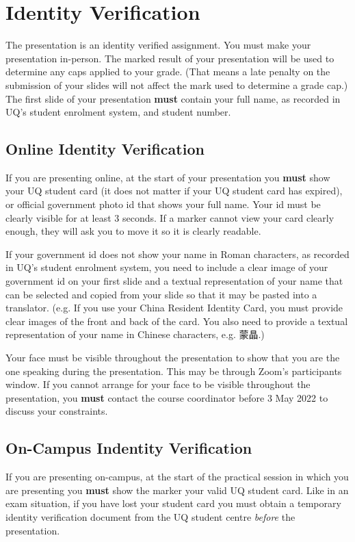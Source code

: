 \documentclass{csse4400}
\begin{document}
\section{Identity Verification}
The presentation is an identity verified assignment.
You must make your presentation in-person.
The marked result of your presentation will be used to determine any caps applied to your grade.
(That means a late penalty on the submission of your slides will not affect the mark used to determine a grade cap.)
The first slide of your presentation \textbf{must} contain your full name, as recorded in UQ's student enrolment system, and student number.

\subsection{Online Identity Verification}
If you are presenting online, at the start of your presentation you \textbf{must} show your UQ student card (it does not matter if your UQ student card has expired),
or official government photo id that shows your full name.
Your id must be clearly visible for at least 3 seconds.
If a marker cannot view your card clearly enough, they will ask you to move it so it is clearly readable.

\begin{CJK*}{UTF8}{gbsn}
If your government id does not show your name in Roman characters,
as recorded in UQ's student enrolment system, you need to include a clear image of your government id on your first slide and a textual
representation of your name that can be selected and copied from your slide so that it may be pasted into a translator.
(e.g. If you use your China Resident Identity Card, you must provide clear images of the front and back
of the card. You also need to provide a textual representation of your name in Chinese characters, e.g. 蒙晶.)
\end{CJK*}

Your face must be visible throughout the presentation to show that you are the one speaking during the presentation.
This may be through Zoom's participants window.
If you cannot arrange for your face to be visible throughout the presentation,
you \textbf{must} contact the course coordinator before 3 May 2022 to discuss your constraints.

\subsection{On-Campus Indentity Verification}
If you are presenting on-campus, at the start of the practical session in which you are presenting
you \textbf{must} show the marker your valid UQ student card.
Like in an exam situation, if you have lost your student card
you must obtain a temporary identity verification document from the UQ student centre \emph{before} the presentation.
\end{document}
